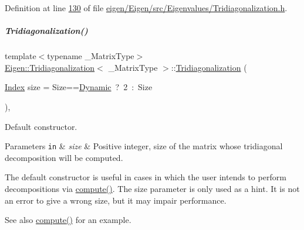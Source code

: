 Definition at line \hyperlink{eigen_2_eigen_2src_2_eigenvalues_2_tridiagonalization_8h_source_l00130}{130} of file \hyperlink{eigen_2_eigen_2src_2_eigenvalues_2_tridiagonalization_8h_source}{eigen/\+Eigen/src/\+Eigenvalues/\+Tridiagonalization.\+h}.

\mbox{\label{group___eigenvalues___module_a9ea2e6154bf35494ee68e037f0867cbd}} 
\subparagraph{\texorpdfstring{Tridiagonalization()}{Tridiagonalization()}\hspace{0.1cm}{\footnotesize\ttfamily [3/4]}}
{\footnotesize\ttfamily template$<$typename \+\_\+\+Matrix\+Type$>$ \\
\hyperlink{group___eigenvalues___module_class_eigen_1_1_tridiagonalization}{Eigen\+::\+Tridiagonalization}$<$ \+\_\+\+Matrix\+Type $>$\+::\hyperlink{group___eigenvalues___module_class_eigen_1_1_tridiagonalization}{Tridiagonalization} (\begin{DoxyParamCaption}\item[{\hyperlink{group___eigenvalues___module_a7bd1f9fccec1e93b77a2214b2d30aae9}{Index}}]{size = {\ttfamily Size==\hyperlink{namespace_eigen_ad81fa7195215a0ce30017dfac309f0b2}{Dynamic}~?~2~\+:~Size} }\end{DoxyParamCaption})\hspace{0.3cm}{\ttfamily [inline]}, {\ttfamily [explicit]}}



Default constructor. 


\begin{DoxyParams}[1]{Parameters}
\mbox{\tt in}  & {\em size} & Positive integer, size of the matrix whose tridiagonal decomposition will be computed.\\
\hline
\end{DoxyParams}
The default constructor is useful in cases in which the user intends to perform decompositions via \hyperlink{group___eigenvalues___module_acd288abb081d3b40b87e4b98cd8f6ee9}{compute()}. The {\ttfamily size} parameter is only used as a hint. It is not an error to give a wrong {\ttfamily size}, but it may impair performance.

\begin{DoxySeeAlso}{See also}
\hyperlink{group___eigenvalues___module_acd288abb081d3b40b87e4b98cd8f6ee9}{compute()} for an example. 
\end{DoxySeeAlso}


